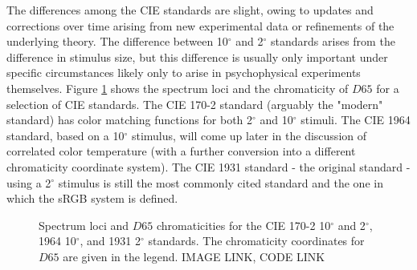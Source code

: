 \documentclass[twocolumn]{article}
\newif\ifinvert
\begin{document}
The differences among the CIE standards are slight, owing to updates and corrections over time arising from new experimental data or refinements of the underlying theory.  The difference between 10$^\circ$ and 2$^\circ$ standards arises from the difference in stimulus size, but this difference is usually only important under specific circumstances likely only to arise in psychophysical experiments themselves.  Figure \ref{fig:chromaticity_spaces} shows the spectrum loci and the chromaticity of $D65$ for a selection of CIE standards.  The CIE 170-2 standard (arguably the "modern" standard) has color matching functions for both 2$^\circ$ and 10$^\circ$ stimuli.  The CIE 1964 standard, based on a 10$^\circ$ stimulus, will come up later in the discussion of correlated color temperature (with a further conversion into a different chromaticity coordinate system).  The CIE 1931 standard - the original standard - using a 2$^\circ$ stimulus is still the most commonly cited standard and the one in which the sRGB system is defined.
\begin{figure}[h]
    \ifinvert
        
    \else
        
    \fi
    \caption{Spectrum loci and $D65$ chromaticities for the CIE 170-2 10$^\circ$ and 2$^\circ$, 1964 10$^\circ$, and 1931 2$^\circ$ standards.  The chromaticity coordinates for $D65$ are given in the legend.  IMAGE LINK, CODE LINK}\label{fig:chromaticity_spaces}
\end{figure}
\end{document}
